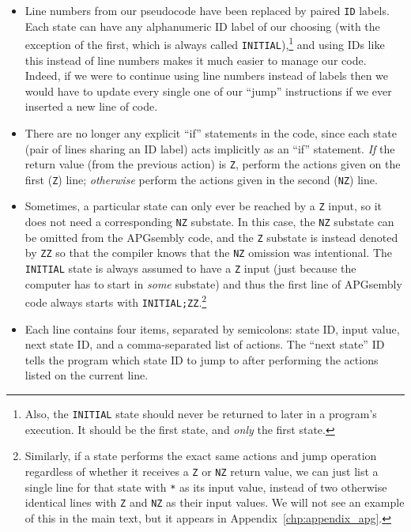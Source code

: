 \begin{itemize}
	\item Line numbers from our pseudocode have been replaced by paired \texttt{ID} labels. Each state can have any alphanumeric ID label of our choosing (with the exception of the first, which is always called \texttt{INITIAL}),\footnote{Also, the \texttt{INITIAL} state should never be returned to later in a program's execution. It should be the first state, and \emph{only} the first state.} and using IDs like this instead of line numbers makes it much easier to manage our code. Indeed, if we were to continue using line numbers instead of labels then we would have to update every single one of our ``jump'' instructions if we ever inserted a new line of code.\smallskip
	
    \item There are no longer any explicit ``if'' statements in the code, since each state (pair of lines sharing an ID label) acts implicitly as an ``if'' statement. \emph{If} the return value (from the previous action) is \texttt{Z}, perform the actions given on the first (\texttt{Z}) line; \emph{otherwise} perform the actions given in the second (\texttt{NZ}) line.\smallskip
    
    \item Sometimes, a particular state can only ever be reached by a \texttt{Z} input, so it does not need a corresponding \texttt{NZ} substate. In this case, the \texttt{NZ} substate can be omitted from the APGsembly code, and the \texttt{Z} substate is instead denoted by \texttt{ZZ} so that the compiler knows that the \texttt{NZ} omission was intentional. The \texttt{INITIAL} state is always assumed to have a \texttt{Z} input (just because the computer has to start in \emph{some} substate) and thus the first line of APGsembly code always starts with \texttt{INITIAL;ZZ}.\footnote{Similarly, if a state performs the exact same actions and jump operation regardless of whether it receives a \texttt{Z} or \texttt{NZ} return value, we can just list a single line for that state with \texttt{*} as its input value, instead of two otherwise identical lines with \texttt{Z} and \texttt{NZ} as their input values. We will not see an example of this in the main text, but it appears in Appendix~\ref{chp:appendix_apg}.}\smallskip
    
    \item Each line contains four items, separated by semicolons: state ID, input value, next state ID, and a comma-separated list of actions. The ``next state'' ID tells the program which state ID to jump to after performing the actions listed on the current line.\smallskip
    

\end{itemize}
